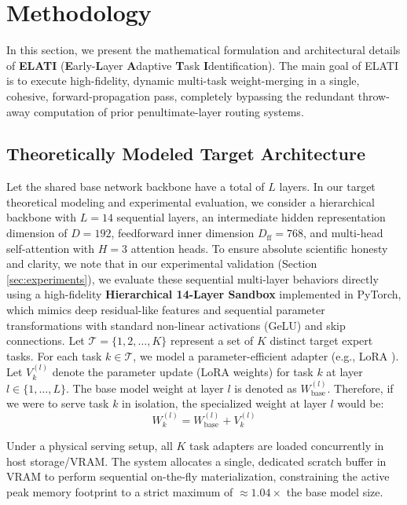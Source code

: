 \section{Methodology}
\label{sec:method}

In this section, we present the mathematical formulation and architectural details of \textbf{ELATI} (\textbf{E}arly-\textbf{L}ayer \textbf{A}daptive \textbf{T}ask \textbf{I}dentification).
The main goal of ELATI is to execute high-fidelity, dynamic multi-task weight-merging in a single, cohesive, forward-propagation pass, completely bypassing the redundant throw-away computation of prior penultimate-layer routing systems.

\subsection{Theoretically Modeled Target Architecture}
Let the shared base network backbone have a total of $L$ layers. In our target theoretical modeling and experimental evaluation, we consider a hierarchical backbone with $L = 14$ sequential layers, an intermediate hidden representation dimension of $D = 192$, feedforward inner dimension $D_{\text{ff}} = 768$, and multi-head self-attention with $H = 3$ attention heads.
To ensure absolute scientific honesty and clarity, we note that in our experimental validation (Section \ref{sec:experiments}), we evaluate these sequential multi-layer behaviors directly using a high-fidelity \textbf{Hierarchical 14-Layer Sandbox} implemented in PyTorch, which mimics deep residual-like features and sequential parameter transformations with standard non-linear activations (GeLU) and skip connections.
Let $\mathcal{T} = \{1, 2, \dots, K\}$ represent a set of $K$ distinct target expert tasks. For each task $k \in \mathcal{T}$, we model a parameter-efficient adapter (e.g., LoRA \cite{hu21lora}). Let $V_k^{(l)}$ denote the parameter update (LoRA weights) for task $k$ at layer $l \in \{1, \dots, L\}$.
The base model weight at layer $l$ is denoted as $W_{\text{base}}^{(l)}$.
Therefore, if we were to serve task $k$ in isolation, the specialized weight at layer $l$ would be:
\begin{equation}
    W_k^{(l)} = W_{\text{base}}^{(l)} + V_k^{(l)}
\end{equation}

Under a physical serving setup, all $K$ task adapters are loaded concurrently in host storage/VRAM.
The system allocates a single, dedicated scratch buffer in VRAM to perform sequential on-the-fly materialization, constraining the active peak memory footprint to a strict maximum of $\approx 1.04\times$ the base model size.


